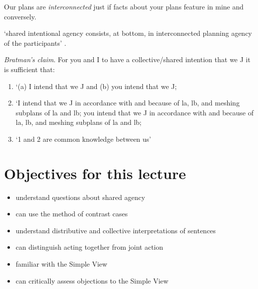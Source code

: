 \documentclass[12pt]{extarticle}
\begin{document}
\begin{multicols*}{3}
Our plans are \emph{interconnected} just if facts about your plans feature in mine and conversely.
 
‘shared intentional agency consists, at bottom, in interconnected planning agency of the participants’ \citep{Bratman:2011fk}.
 
\begin{minipage}{\columnwidth}
 
\emph{Bratman’s claim}. For you and I to have a collective/shared intention that we J it is sufficient that:
 
\begin{enumerate}[label=({\arabic*}),itemsep=0pt,topsep=0pt]
 
\item  `(a) I intend that we J and (b) you intend that we J;
 
\item `I intend that we J in accordance with and because of la, lb, and meshing subplans of la and lb; you intend that we J in accordance with and because of la, lb, and meshing subplans of la and lb;
 
\item `1 and 2 are common knowledge between us' \citep[View 4]{Bratman:1993je}
 
\end{enumerate}
 
\end{minipage}
 
\section{Objectives for this lecture}
 \begin{itemize}
\item 
understand questions about shared agency

          
\item can use the method of contrast cases

          
\item understand distributive and collective interpretations of sentences

          
\item can distinguish acting together from joint action

          
\item familiar with the Simple View

          
\item can critically assess objections to the Simple View

\end{itemize}
 

    
 
\footnotesize 


\end{multicols*}
\end{document}
